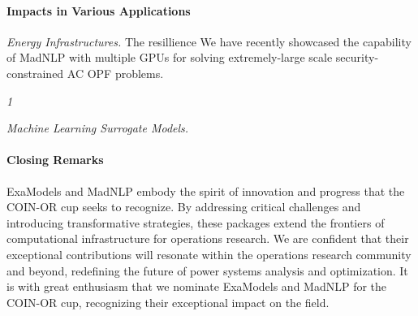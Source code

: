 \documentclass{article}
\begin{document}
\paragraph{Impacts in Various Applications}

{\it Energy Infrastructures.} The resillience We have recently showcased the capability of MadNLP with multiple GPUs for solving extremely-large scale security-constrained AC OPF problems.

{\it 1}

{\it Machine Learning Surrogate Models.}

\paragraph{Closing Remarks}
ExaModels and MadNLP embody the spirit of innovation and progress that the COIN-OR cup seeks to recognize. By addressing critical challenges and introducing transformative strategies, these packages extend the frontiers of computational infrastructure for operations research. We are confident that their exceptional contributions will resonate within the operations research community and beyond, redefining the future of power systems analysis and optimization. It is with great enthusiasm that we nominate ExaModels and MadNLP for the COIN-OR cup, recognizing their exceptional impact on the field.


\end{document}

